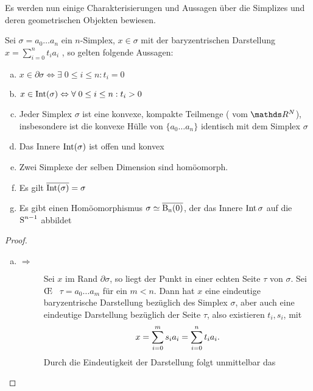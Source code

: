 
Es werden nun einige Charakterisierungen und Aussagen über die
Simplizes und deren geometrischen Objekten bewiesen.

\begin{Satz}
  \normalfont Sei $\sigma = a_0 \ldots a_n $ ein $n$-Simplex,
  $x \in \sigma$ mit der baryzentrischen Darstellung
  $x=\sum\limits_{i=0}^n t_i a_i$ , so gelten folgende Aussagen:
  \begin{enumerate}[(a)]
  \item
    $x \in \partial\sigma \Leftrightarrow \exists \; 0 \leq i \leq n :
    t_i = 0$
  \item
    $x \in \Int(\sigma) \Leftrightarrow \forall \; 0 \leq i \leq n :
    t_i > 0$
  \item Jeder Simplex $\sigma$ ist eine konvexe, kompakte Teilmenge (
    vom $\R^N$), insbesondere ist die konvexe Hülle von
    $\{ a_0 \ldots a_n \}$ identisch mit dem Simplex $\sigma$
  \item Das Innere $\Int(\sigma)$ ist offen und konvex
  \item Zwei Simplexe der selben Dimension sind homöomorph.
  \item Es gilt $\overline{\Int(\sigma)} = \sigma$
  \item Es gibt einen Homöomorphismus $\sigma \simeq \Bn$, der das
    Innere $\Int{\sigma}$ auf die $\Sp^{n-1}$ abbildet
  \end{enumerate}
  \begin{proof}
    \begin{enumerate}[a):]
    \item
      \begin{description}
      \item[\glqq $\Rightarrow$\grqq] Sei $x$ im Rand
        $\partial\sigma$, so liegt der Punkt in einer echten Seite
        $\tau$ von $\sigma$. Sei \OE~ $\tau = a_0 \ldots a_m$ für ein
        $m < n$. Dann hat $x$ eine eindeutige baryzentrische
        Darstellung bezüglich des Simplex $\sigma$, aber auch eine
        eindeutige Darstellung bezüglich der Seite $\tau$, also
        existieren $t_i,s_i$, mit
        \begin{gather*}
          x = \sp{0}{m} s_i a_i = \sp{0}{n} t_i a_i .
        \end{gather*}
        Durch die Eindeutigkeit der Darstellung folgt unmittelbar das

\end{description}
\end{enumerate}
\end{proof}
\end{Satz}
